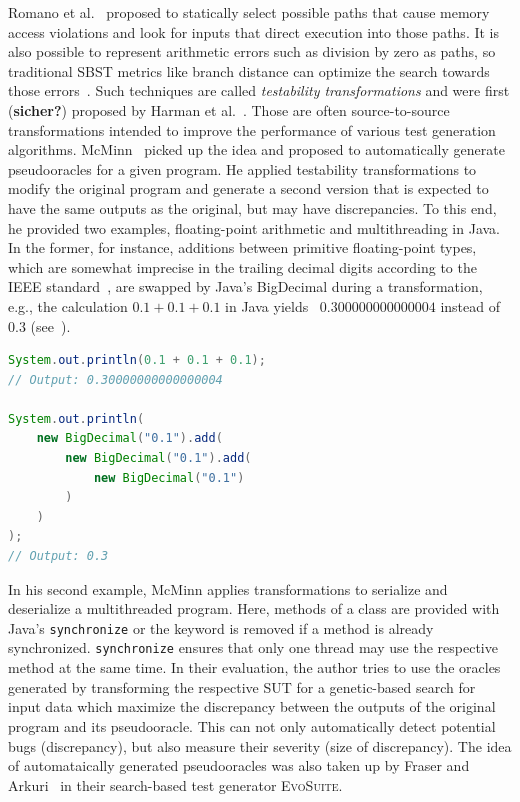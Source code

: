 \documentclass[paper=a4,%
  twoside,%
  BCOR4mm,%
  abstract=true,%
  toc=bibliography,%
  chapterprefix=true,%
  toc=bibliographynumbered,%
  open=right,%
  english,%
  pagesize=pdftex]{scrreprt}
\begin{document}
Romano et al.~\cite{Romano2011} proposed to statically select possible paths that cause memory access violations and look for inputs that direct execution into those paths. It is also possible to represent arithmetic errors such as division by zero as paths, so traditional \ac{SBST} metrics like branch distance can optimize the search towards those errors~\cite{Bhattacharya2011}. Such techniques are called \textit{testability transformations} and were first (\textbf{sicher?}) proposed by Harman et al.~\cite{Harman2004}. Those are often source-to-source transformations intended to improve the performance of various test generation algorithms. McMinn~\cite{McMinn2009} picked up the idea and proposed to automatically generate pseudooracles for a given program. He applied testability transformations to modify the original program and generate a second version that is expected to have the same outputs as the original, but may have discrepancies. To this end, he provided two examples, floating-point arithmetic and multithreading in Java. In the former, for instance, additions between primitive floating-point types, which are somewhat imprecise in the trailing decimal digits according to the IEEE standard~\cite{10.1145/103162.103163}, are swapped by Java's BigDecimal during a transformation, e.g., the calculation $0.1 + 0.1 + 0.1$ in Java yields ~$0.300000000000004$ instead of~$0.3$ (see~).

\begin{lstlisting}[language=Java, style=boxed, caption={Comparing floating-point arithmetic in Java using double compared to \code{BigDecimal}~\cite{McMinn2009}}, label=lst:java-transformations]
System.out.println(0.1 + 0.1 + 0.1);
// Output: 0.30000000000000004

System.out.println(
    new BigDecimal("0.1").add(
        new BigDecimal("0.1").add(
            new BigDecimal("0.1")
        )
    )
);
// Output: 0.3
\end{lstlisting}

In his second example, McMinn applies transformations to serialize and deserialize a multithreaded program. Here, methods of a class are provided with Java's \texttt{synchronize} or the keyword is removed if a method is already synchronized. \texttt{synchronize} ensures that only one thread may use the respective method at the same time. In their evaluation, the author tries to use the oracles generated by transforming the respective \ac{SUT} for a genetic-based search for input data which maximize the discrepancy between the outputs of the original program and its pseudooracle. This can not only automatically detect potential bugs (discrepancy), but also measure their severity (size of discrepancy). The idea of automataically generated pseudooracles was also taken up by Fraser and Arkuri~\cite{Fraser_2013} in their search-based test generator \textsc{EvoSuite}.
\end{document}
